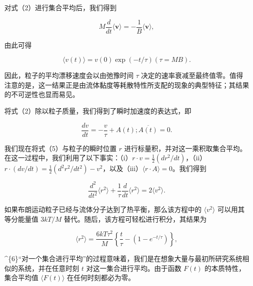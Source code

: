 对式（2）进行集合平均后，我们得到

\begin{equation}\tag{15.3.3}\label{eq:15.3.3}
M \frac { d } { d t } \langle \pmb { v } \rangle = - \frac { 1 } { B } \langle \pmb { v } \rangle ,
\end{equation}

由此可得

\begin{equation}\tag{15.3.4}\label{eq:15.3.4}
\langle v ( t ) \rangle = v ( 0 ) \exp ( - t / \tau )  ( \tau = M B ) .
\end{equation}

因此，粒子的平均漂移速度会以由弛豫时间 \(\tau\) 决定的速率衰减至最终值零。值得注意的是，这一结果正是由流体黏度等耗散特性所支配的现象的典型特征；其结果的不可逆性也显而易见。

将式（2）除以粒子质量，我们得到了瞬时加速度的表达式，即

\begin{equation}\tag{15.3.5}\label{eq:15.3.5}
\frac { d v } { d t } = - \frac { v } { \tau } + A ( t ) ;  \overline { { A ( t ) } } = 0 .
\end{equation}

我们现在将式（5）与粒子的瞬时位置 \(r\) 进行标量积，并对这一乘积取集合平均。在这一过程中，我们利用了以下事实：（i）\(r \cdot v = \frac{1}{2}(dr^2/dt)\)，（ii）\(r \cdot (dv/dt) = \frac{1}{2}(d^2r^2/dt^2) - v^2\)，以及（iii）\(\langle r \cdot A \rangle = 0\)。我们得到

\begin{equation}\tag{15.3.6}\label{eq:15.3.6}
\frac { d ^{2} } { d t ^{2} } \langle r ^{2} \rangle + \frac { 1 } { \tau } \frac { d } { d t } \langle r ^{2} \rangle = 2 \langle v ^{2} \rangle .
\end{equation}

如果布朗运动粒子已经与流体分子达到了热平衡，那么该方程中的 \(\langle v^{2}\rangle\) 可以用其等分能量值 \(3kT/M\) 替代。随后，该方程可轻松进行积分，其结果为

\begin{equation}\tag{15.3.7}\label{eq:15.3.7}
\langle r ^{2} \rangle = \frac { 6 k T \tau ^{2} } { M } \left\{ \frac { t } { \tau } - ( 1 - e ^{- t / \tau} ) \right\} ,
\end{equation}

\^{}\{6\}``对一个集合进行平均''的过程意味着，我们是在想象大量与最初所研究系统相似的系统，并在任意时刻 \(t\) 对这一集合进行平均。由于函数 \(F(t)\) 的本质特性，集合平均值 \(\langle F(t) \rangle\) 在任何时刻都必为零。

